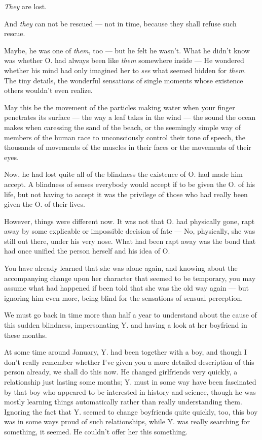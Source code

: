 \emph{They} are lost. 

And \emph{they} can not be rescued --- not in time, because they shall refuse such rescue.

Maybe, he was one of \emph{them}, too --- but he felt he wasn't. What he didn't know was whether O. had always been like \emph{them} somewhere inside --- He wondered whether his mind had only imagined her to \emph{see} what seemed hidden for \emph{them}. The tiny details, the wonderful sensations of single moments whose existence others wouldn't even realize.

May this be the movement of the particles making water when your finger penetrates its surface --- the way a leaf takes in the wind --- the sound the ocean makes when caressing the sand of the beach, or the seemingly simple way of members of the human race to unconsciously control their tone of speech, the thousands of movements of the muscles in their faces or the movements of their eyes.

Now, he had lost quite all of the blindness the existence of O. had made him accept. A blindness of senses everybody would accept if to be given the O. of his life, but not having to accept it was the privilege of those who had really been given the O. of their lives.

However, things were different now. It was not that O. had physically gone, rapt away by some explicable or impossible decision of fate --- No, physically, she was still out there, under his very nose. What had been rapt away was the bond that had once unified the person herself and his idea of O.

You have already learned that she was alone again, and knowing about the accompanying change upon her character that seemed to be temporary, you may assume what had happened if been told that she was the old way again --- but ignoring him even more, being blind for the sensations of sensual perception.

We must go back in time more than half a year to understand about the cause of this sudden blindness, impersonating Y. and having a look at her boyfriend in these months.

At some time around January, Y. had been together with a boy, and though I don't really remember whether I've given you a more detailed description of this person already, we shall do this now. He changed girlfriends very quickly, a relationship just lasting some months; Y. must in some way have been fascinated by that boy who appeared to be interested in history and science, though he was mostly learning things automatically rather than really understanding them. Ignoring the fact that Y. seemed to change boyfriends quite quickly, too, this boy was in some ways proud of such relationships, while Y. was really searching for something, it seemed. He couldn't offer her this something.

